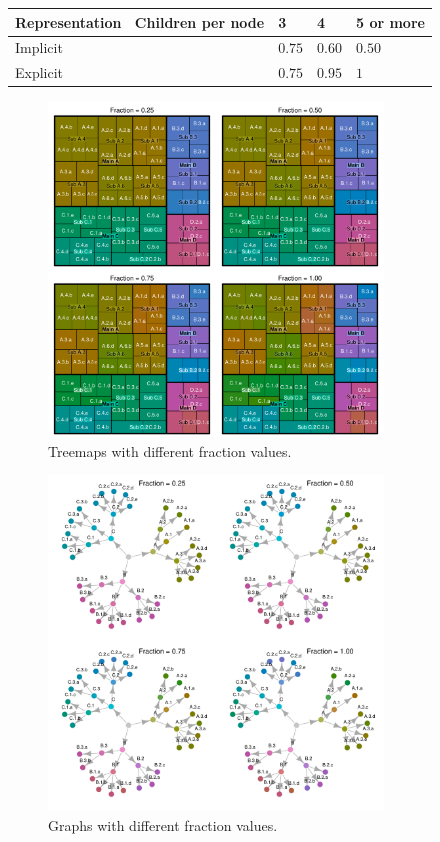 \documentclass[journal]{vgtc}                %
\begin{document}
\begin{tabular}{llll} 
\toprule 
Representation \ Children per node & 3 & 4 & 5 or more\\ 
\midrule 
Implicit & $0.75$ & $0.60$ & $0.50$ \\ 
Explicit & $0.75$ & $0.95$ & $1$ \\ 
\bottomrule 
\end{tabular}



\begin{figure}[htb]
  \centering
  \includegraphics[width=3.5in]{Treemaps_hue.pdf}
  \caption{Treemaps with different fraction values.}\label{fig:treemapf}
\end{figure}


\begin{figure}[htb]
  \centering
  \includegraphics[width=3.5in]{Graph_hue.pdf}
  \caption{Graphs with different fraction values.}\label{fig:graphf}
\end{figure}
\end{document}
